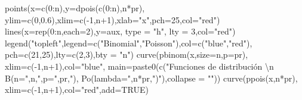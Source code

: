 \documentclass[
  letterpaper,
  DIV=11,
  numbers=noendperiod]{scrreprt}
\newenvironment{Shaded}{\begin{snugshade}}{\end{snugshade}}
\newcommand{\AttributeTok}[1]{\textcolor[rgb]{0.40,0.45,0.13}{#1}}
\newcommand{\ConstantTok}[1]{\textcolor[rgb]{0.56,0.35,0.01}{#1}}
\newcommand{\DecValTok}[1]{\textcolor[rgb]{0.68,0.00,0.00}{#1}}
\newcommand{\FloatTok}[1]{\textcolor[rgb]{0.68,0.00,0.00}{#1}}
\newcommand{\FunctionTok}[1]{\textcolor[rgb]{0.28,0.35,0.67}{#1}}
\newcommand{\NormalTok}[1]{\textcolor[rgb]{0.00,0.23,0.31}{#1}}
\newcommand{\SpecialCharTok}[1]{\textcolor[rgb]{0.37,0.37,0.37}{#1}}
\newcommand{\StringTok}[1]{\textcolor[rgb]{0.13,0.47,0.30}{#1}}
\begin{document}
\begin{Shaded}
\begin{Highlighting}[]
  \FunctionTok{points}\NormalTok{(}\AttributeTok{x=}\FunctionTok{c}\NormalTok{(}\DecValTok{0}\SpecialCharTok{:}\NormalTok{n),}\AttributeTok{y=}\FunctionTok{dpois}\NormalTok{(}\FunctionTok{c}\NormalTok{(}\DecValTok{0}\SpecialCharTok{:}\NormalTok{n),n}\SpecialCharTok{*}\NormalTok{pr),}
       \AttributeTok{ylim=}\FunctionTok{c}\NormalTok{(}\DecValTok{0}\NormalTok{,}\FloatTok{0.6}\NormalTok{),}\AttributeTok{xlim=}\FunctionTok{c}\NormalTok{(}\SpecialCharTok{{-}}\DecValTok{1}\NormalTok{,n}\SpecialCharTok{+}\DecValTok{1}\NormalTok{),}\AttributeTok{xlab=}\StringTok{"x"}\NormalTok{,}\AttributeTok{pch=}\DecValTok{25}\NormalTok{,}\AttributeTok{col=}\StringTok{"red"}\NormalTok{)}
  \FunctionTok{lines}\NormalTok{(}\AttributeTok{x=}\FunctionTok{rep}\NormalTok{(}\DecValTok{0}\SpecialCharTok{:}\NormalTok{n,}\AttributeTok{each=}\DecValTok{2}\NormalTok{),}\AttributeTok{y=}\NormalTok{aux, }\AttributeTok{type =} \StringTok{"h"}\NormalTok{, }\AttributeTok{lty =} \DecValTok{3}\NormalTok{,}\AttributeTok{col=}\StringTok{"red"}\NormalTok{)}
  \FunctionTok{legend}\NormalTok{(}\StringTok{"topleft"}\NormalTok{,}\AttributeTok{legend=}\FunctionTok{c}\NormalTok{(}\StringTok{"Binomial"}\NormalTok{,}\StringTok{"Poisson"}\NormalTok{),}\AttributeTok{col=}\FunctionTok{c}\NormalTok{(}\StringTok{"blue"}\NormalTok{,}\StringTok{"red"}\NormalTok{), }
         \AttributeTok{pch=}\FunctionTok{c}\NormalTok{(}\DecValTok{21}\NormalTok{,}\DecValTok{25}\NormalTok{),}\AttributeTok{lty=}\FunctionTok{c}\NormalTok{(}\DecValTok{2}\NormalTok{,}\DecValTok{3}\NormalTok{),}\AttributeTok{bty =} \StringTok{"n"}\NormalTok{)}
  \FunctionTok{curve}\NormalTok{(}\FunctionTok{pbinom}\NormalTok{(x,}\AttributeTok{size=}\NormalTok{n,}\AttributeTok{p=}\NormalTok{pr),}
        \AttributeTok{xlim=}\FunctionTok{c}\NormalTok{(}\SpecialCharTok{{-}}\DecValTok{1}\NormalTok{,n}\SpecialCharTok{+}\DecValTok{1}\NormalTok{),}\AttributeTok{col=}\StringTok{"blue"}\NormalTok{,}
        \AttributeTok{main=}\FunctionTok{paste0}\NormalTok{(}\FunctionTok{c}\NormalTok{(}\StringTok{"Funciones de distribución }\SpecialCharTok{\textbackslash{}n}\StringTok{ B(n="}\NormalTok{,n,}\StringTok{",p="}\NormalTok{,pr,}\StringTok{"),}
\StringTok{                       Po(lambda="}\NormalTok{,n}\SpecialCharTok{*}\NormalTok{pr,}\StringTok{")"}\NormalTok{),}\AttributeTok{collapse =} \StringTok{""}\NormalTok{))}
  \FunctionTok{curve}\NormalTok{(}\FunctionTok{ppois}\NormalTok{(x,n}\SpecialCharTok{*}\NormalTok{pr),}
        \AttributeTok{xlim=}\FunctionTok{c}\NormalTok{(}\SpecialCharTok{{-}}\DecValTok{1}\NormalTok{,n}\SpecialCharTok{+}\DecValTok{1}\NormalTok{),}\AttributeTok{col=}\StringTok{"red"}\NormalTok{,}\AttributeTok{add=}\ConstantTok{TRUE}\NormalTok{)}

\end{Highlighting}
\end{Shaded}
\end{document}
